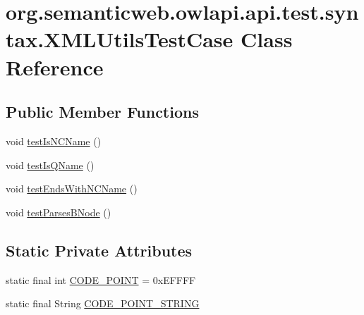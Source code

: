 \hypertarget{classorg_1_1semanticweb_1_1owlapi_1_1api_1_1test_1_1syntax_1_1_x_m_l_utils_test_case}{\section{org.\-semanticweb.\-owlapi.\-api.\-test.\-syntax.\-X\-M\-L\-Utils\-Test\-Case Class Reference}
\label{classorg_1_1semanticweb_1_1owlapi_1_1api_1_1test_1_1syntax_1_1_x_m_l_utils_test_case}
}
\subsection*{Public Member Functions}
\begin{DoxyCompactItemize}
\item 
void \hyperlink{classorg_1_1semanticweb_1_1owlapi_1_1api_1_1test_1_1syntax_1_1_x_m_l_utils_test_case_a02996128b00f0c94fcd690db18bafa69}{test\-Is\-N\-C\-Name} ()
\item 
void \hyperlink{classorg_1_1semanticweb_1_1owlapi_1_1api_1_1test_1_1syntax_1_1_x_m_l_utils_test_case_a00d3e4623755d80b6db931b43b7d56e8}{test\-Is\-Q\-Name} ()
\item 
void \hyperlink{classorg_1_1semanticweb_1_1owlapi_1_1api_1_1test_1_1syntax_1_1_x_m_l_utils_test_case_a513499da31c0d9f18549f347331e43cf}{test\-Ends\-With\-N\-C\-Name} ()
\item 
void \hyperlink{classorg_1_1semanticweb_1_1owlapi_1_1api_1_1test_1_1syntax_1_1_x_m_l_utils_test_case_a326dd3965a561b3b28bdfc74004a0708}{test\-Parses\-B\-Node} ()
\end{DoxyCompactItemize}
\subsection*{Static Private Attributes}
\begin{DoxyCompactItemize}
\item 
static final int \hyperlink{classorg_1_1semanticweb_1_1owlapi_1_1api_1_1test_1_1syntax_1_1_x_m_l_utils_test_case_aabcff3fcdecc93316a570e0cb0ef3ba4}{C\-O\-D\-E\-\_\-\-P\-O\-I\-N\-T} = 0x\-E\-F\-F\-F\-F
\item 
static final String \hyperlink{classorg_1_1semanticweb_1_1owlapi_1_1api_1_1test_1_1syntax_1_1_x_m_l_utils_test_case_aa8d15fc0e42fe322a115c68dab79cabd}{C\-O\-D\-E\-\_\-\-P\-O\-I\-N\-T\-\_\-\-S\-T\-R\-I\-N\-G}
\end{DoxyCompactItemize}


